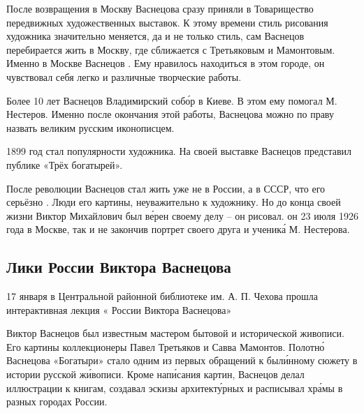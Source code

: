 После возвращения в Москву Васнецова сразу приняли в Товарищество передвижных художественных выставок. К этому времени стиль рисования художника значительно меняется, да и не только стиль, сам Васнецов перебирается жить в Москву, где сближается с Третьяковым и Мамонтовым. Именно в Москве Васнецов . Ему нравилось находиться в этом городе, он чувствовал себя легко и  различные творческие работы.

Более 10 лет Васнецов  Владимирский соб\'{о}р в Киеве. В этом ему помогал М. Нестеров. Именно после окончания этой работы, Васнецова можно по праву назвать великим русским иконописцем.

1899 год стал  популярности художника. На своей выставке Васнецов представил публике «Трёх богатырей».

После революции Васнецов стал жить уже не в России, а в СССР, что его серьёзно . Люди  его картины,  неуважительно к художнику. Но до конца своей жизни Виктор Михайлович был в\'{е}рен своему делу -- он рисовал.  он 23 июля 1926 года в Москве, так и не закончив портрет своего друга и ученик\'{а} М. Нестерова.



\subsection{Лики России Виктора Васнецова}

17 января в Центральной районной библиотеке им. А. П. Чехова прошла интерактивная лекция « России Виктора Васнецова»

Виктор Васнецов был известным мастером бытовой и исторической живописи. Его картины  коллекционеры Павел Третьяков и Савва Мамонтов. Полотн\'{о} Васнецова «Богатыри» стало одним из первых обращений к был\'{и}нному сюжету в истории русской ж\'{и}вописи. Кроме нап\'{и}сания картин, Васнецов делал иллюстрации к книгам, создавал эскизы архитект\'{у}рных  и расписывал хр\'{а}мы в разных городах России.

